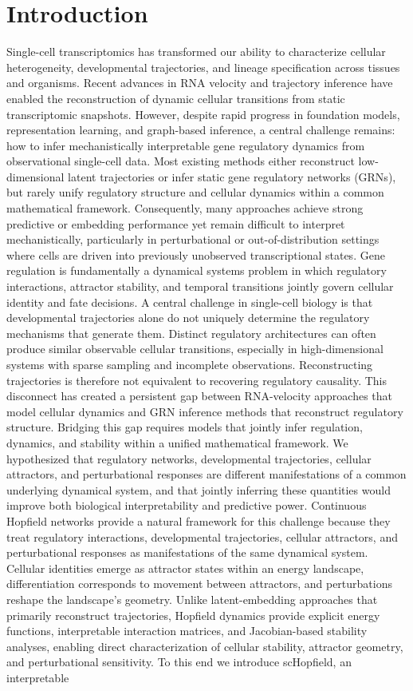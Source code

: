 \documentclass[11pt]{article}
\begin{document}
\section*{Introduction}
Single-cell transcriptomics has transformed our ability to characterize cellular heterogeneity, developmental trajectories, and lineage specification across tissues and organisms. Recent advances in RNA velocity and trajectory inference have enabled the reconstruction of dynamic cellular transitions from static transcriptomic snapshots. However, despite rapid progress in foundation models, representation learning, and graph-based inference, a central challenge remains: how to infer mechanistically interpretable gene regulatory dynamics from observational single-cell data. Most existing methods either reconstruct low-dimensional latent trajectories or infer static gene regulatory networks (GRNs), but rarely unify regulatory structure and cellular dynamics within a common mathematical framework. Consequently, many approaches achieve strong predictive or embedding performance yet remain difficult to interpret mechanistically, particularly in perturbational or out-of-distribution settings where cells are driven into previously unobserved transcriptional states. Gene regulation is fundamentally a dynamical systems problem in which regulatory interactions, attractor stability, and temporal transitions jointly govern cellular identity and fate decisions.  A central challenge in single-cell biology is that developmental trajectories alone do not uniquely determine the regulatory mechanisms that generate them. Distinct regulatory architectures can often produce similar observable cellular transitions, especially in high-dimensional systems with sparse sampling and incomplete observations. Reconstructing trajectories is therefore not equivalent to recovering regulatory causality. This disconnect has created a persistent gap between RNA-velocity approaches that model cellular dynamics and GRN inference methods that reconstruct regulatory structure. Bridging this gap requires models that jointly infer regulation, dynamics, and stability within a unified mathematical framework. We hypothesized that regulatory networks, developmental trajectories, cellular attractors, and perturbational responses are different manifestations of a common underlying dynamical system, and that jointly inferring these quantities would improve both biological interpretability and predictive power.  Continuous Hopfield networks provide a natural framework for this challenge because they treat regulatory interactions, developmental trajectories, cellular attractors, and perturbational responses as manifestations of the same dynamical system. Cellular identities emerge as attractor states within an energy landscape, differentiation corresponds to movement between attractors, and perturbations reshape the landscape's geometry. Unlike latent-embedding approaches that primarily reconstruct trajectories, Hopfield dynamics provide explicit energy functions, interpretable interaction matrices, and Jacobian-based stability analyses, enabling direct characterization of cellular stability, attractor geometry, and perturbational sensitivity. To this end we introduce scHopfield, an interpretable 
\end{document}
